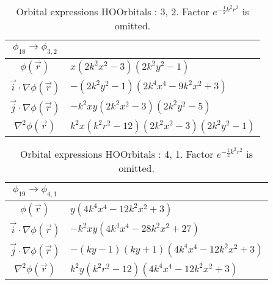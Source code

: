\begin{table}
\begin{center}
\begin{tabular}{c|l}
$\phi_{18} \rightarrow \phi_{3, 2}$\\
\hline
$\phi(\vec r)$ & $x \left(2 k^{2} x^{2} -3\right) \left(2 k^{2} y^{2} -1\right)$\\
\hline
$\vec i\cdot \nabla \phi(\vec r)$ & $- \left(2 k^{2} y^{2} -1\right) \left(2 k^{4} x^{4} - 9 k^{2} x^{2} + 3\right)$\\
$\vec j\cdot \nabla \phi(\vec r)$ & $- k^{2} x y \left(2 k^{2} x^{2} -3\right) \left(2 k^{2} y^{2} -5\right)$\\
\hline
$\nabla^2 \phi(\vec r)$ & $k^{2} x \left(k^{2} r^{2} -12\right) \left(2 k^{2} x^{2} -3\right) \left(2 k^{2} y^{2} -1\right)$\\
\end{tabular}
\caption{Orbital expressions HOOrbitals : 3, 2. Factor $e^{- \frac{1}{2} k^{2} r^{2}}$ is omitted.}
\end{center}
\end{table}


\begin{table}
\begin{center}
\begin{tabular}{c|l}
$\phi_{19} \rightarrow \phi_{4, 1}$\\
\hline
$\phi(\vec r)$ & $y \left(4 k^{4} x^{4} - 12 k^{2} x^{2} + 3\right)$\\
\hline
$\vec i\cdot \nabla \phi(\vec r)$ & $- k^{2} x y \left(4 k^{4} x^{4} - 28 k^{2} x^{2} + 27\right)$\\
$\vec j\cdot \nabla \phi(\vec r)$ & $- \left(k y -1\right) \left(k y + 1\right) \left(4 k^{4} x^{4} - 12 k^{2} x^{2} + 3\right)$\\
\hline
$\nabla^2 \phi(\vec r)$ & $k^{2} y \left(k^{2} r^{2} -12\right) \left(4 k^{4} x^{4} - 12 k^{2} x^{2} + 3\right)$\\
\end{tabular}
\caption{Orbital expressions HOOrbitals : 4, 1. Factor $e^{- \frac{1}{2} k^{2} r^{2}}$ is omitted.}
\end{center}
\end{table}

\clearpage

